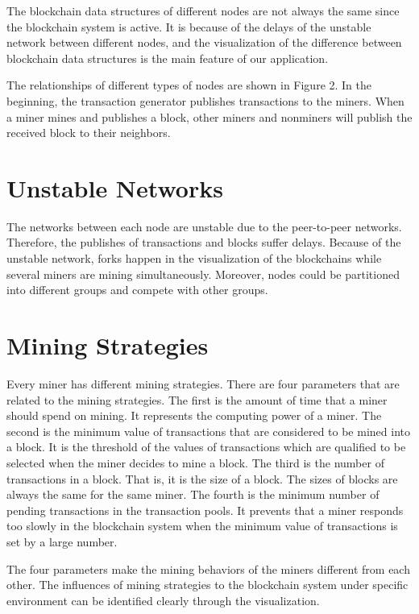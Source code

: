 The blockchain data structures of different nodes are not always the same since the blockchain system is active. It is because of the delays of the unstable network between different nodes, and the visualization of the difference between blockchain data structures is the main feature of our application.

The relationships of different types of nodes are shown in Figure 2. In the beginning, the transaction generator publishes transactions to the miners. When a miner mines and publishes a block, other miners and nonminers will publish the received block to their neighbors.

\section{Unstable Networks}

The networks between each node are unstable due to the peer-to-peer networks. Therefore, the publishes of transactions and blocks suffer delays. Because of the unstable network, forks happen in the visualization of the blockchains while several miners are mining simultaneously. Moreover, nodes could be partitioned into different groups and compete with other groups.

\section{Mining Strategies}

Every miner has different mining strategies. There are four parameters that are related to the mining strategies. The first is the amount of time that a miner should spend on mining. It represents the computing power of a miner. The second is the minimum value of transactions that are considered to be mined into a block. It is the threshold of the values of transactions which are qualified to be selected when the miner decides to mine a block. The third is the number of transactions in a block. That is, it is the size of a block. The sizes of blocks are always the same for the same miner. The fourth is the minimum number of pending transactions in the transaction pools. It prevents that a miner responds too slowly in the blockchain system when the minimum value of transactions is set by a large number.

The four parameters make the mining behaviors of the miners different from each other. The influences of mining strategies to the blockchain system under specific environment can be identified clearly through the visualization.

